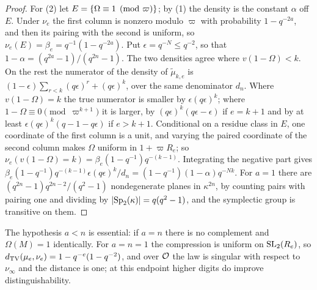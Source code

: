 \begin{proof}
For (2) let $E=\{\Omega\equiv1\pmod\varpi\}$; by (1) the density is the constant $\alpha$ off
$E$. Under $\nu_e$ the first column is nonzero modulo $\varpi$ with probability $1-q^{-2a}$, and
then its pairing with the second is uniform, so $\nu_e(E)=\beta_e=q^{-1}(1-q^{-2a})$. Put
$\epsilon=q^{-N}\le q^{-2}$, so that $1-\alpha=(q^{2a}-1)/(q^{2n}-1)$. The two densities agree
where $v(1-\Omega)<k$. On the rest the numerator of the density of
$\widetilde\mu_{k,e}$ is $(1-\epsilon)\sum_{r<k}(q\epsilon)^r+(q\epsilon)^k$, over the same
denominator $d_n$. Where $v(1-\Omega)=k$ the true numerator is smaller by $\epsilon(q\epsilon)^k$;
where $1-\Omega\equiv0\pmod{\varpi^{k+1}}$ it is larger, by $(q\epsilon)^k(q\epsilon-\epsilon)$ if
$e=k+1$ and by at least $\epsilon(q\epsilon)^k(q-1-q\epsilon)$ if $e>k+1$. Conditional on a residue
class in $E$, one coordinate of the first column is a unit, and varying the paired coordinate of
the second column makes $\Omega$ uniform in $1+\varpi R_e$; so $\nu_e(v(1-\Omega)=k)
=\beta_e(1-q^{-1})q^{-(k-1)}$. Integrating the negative part gives
$\beta_e(1-q^{-1})q^{-(k-1)}\epsilon(q\epsilon)^k/d_n=(1-q^{-1})(1-\alpha)q^{-Nk}$. For $a=1$ there
are $(q^{2n}-1)q^{2n-2}/(q^2-1)$ nondegenerate planes in $\kappa^{2n}$, by counting pairs with pairing
one and dividing by $\lvert\operatorname{Sp}_2(\kappa)\rvert=q(q^2-1)$, and the symplectic group is transitive on them.
\end{proof}

\begin{remark}[The endpoint $a=n$]\label{spn:rem:padic-endpoint}
The hypothesis $a<n$ is essential: if $a=n$ there is no complement and $\Omega(M)=1$
identically. For $a=n=1$ the compression is uniform on $\operatorname{SL}_2(R_e)$, so
$d_{\mathrm{TV}}(\mu_e,\nu_e)=1-q^{-e}(1-q^{-2})$, and over $\mathcal{O}$ the law is singular with respect to
$\nu_\infty$ and the distance is one; at this endpoint higher digits do improve
distinguishability.
\end{remark}

